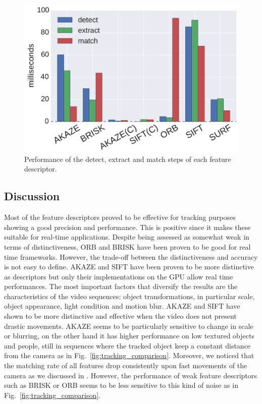 \begin{figure}[!htb]
	\includegraphics[width=0.95\linewidth]{imgs/performances.pdf}
\vspace{-2.5mm}	
\caption{Performance of the detect, extract and match steps of each feature descriptor.}
\label{fig:speed_b}
\end{figure}


\subsection{Discussion}

Most of the feature descriptors proved to be effective for tracking purposes showing a good precision and performance. This is positive since it makes these suitable for real-time applications. Despite being assessed as somewhat weak in terms of distinctiveness, ORB and BRISK have been proven to be good for real time frameworks. 
However, the trade-off between the distinctiveness and accuracy is not easy to define.
AKAZE and SIFT have been proven to be more distinctive as descriptors but only their implementations on the GPU allow real time performances. 
The most important factors that diversify the results are the characteristics of the video sequences: object transformations, in particular scale, object appearance, light condition and motion blur. AKAZE and SIFT have shown to be more distinctive and effective when the video does not present drastic movements. AKAZE seems to be particularly sensitive to change in scale or blurring, on the other hand it has higher performance on low textured objects and people, still in sequences where the tracked object keep a constant distance from the camera as in Fig.~\ref{fig:tracking_comparison}.
Moreover, we noticed that the matching rate of all features drop consistently upon fast movements of the camera as we discussed in \cite{pieropan15}. However, the performance of weak feature descriptors such as BRISK or ORB seems to be less sensitive to this kind of noise as in Fig.~\ref{fig:tracking_comparison}. 

